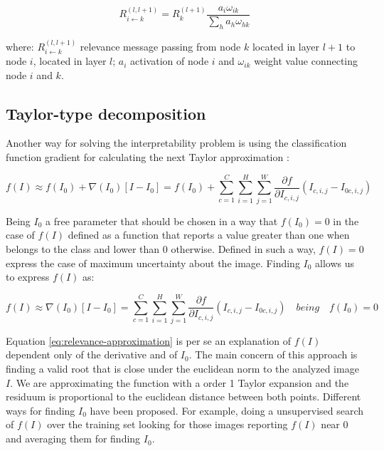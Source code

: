 \documentclass[preprint]{elsarticle}
\theoremstyle{definition} %
\theoremstyle{remark}
\begin{document}
\begin{equation}
R_{i \leftarrow k}^{(l,l+1)} = R_k^{(l+1)} \frac{a_i \omega_{ik}}{\sum_{h} a_h \omega_{hk}}
\label{eq:relevance-message-value}
\end{equation}

where: $R_{i \leftarrow k}^{(l,l+1)}$ relevance message passing from node $k$ located in layer $l+1$ to node $i$, located in layer $l$; $a_i$ activation of node $i$ and $\omega_{ik}$ weight value connecting node $i$ and $k$.


\subsection{Taylor-type decomposition} 

Another way for solving the interpretability problem is using the classification function gradient for calculating the next Taylor approximation \cite{bach2015pixel}:

\begin{equation}
f(I) \approx f(I_0) + \nabla(I_0) [ I - I_0] = f(I_0) + \sum_{c=1}^C \sum_{i=1}^{H} \sum_{j=1}^W \frac{\partial f}{\partial I_{c,i,j}}(I_{c,i,j} - I_{0 c, i, j}) 
\label{eq:taylor}
\end{equation}

Being $I_0$ a free parameter that should be chosen in a way that $f(I_0) = 0$ in the case of $f(I)$ defined as a function that reports a value greater than one when belongs to the class and lower than 0 otherwise. Defined in such a way, $f(I) = 0$ express the case of maximum uncertainty about the image. Finding $I_0$ allows us to express $f(I)$ as:

\begin{equation}
f(I) \approx \nabla(I_0) [ I - I_0] = \sum_{c=1}^C \sum_{i=1}^{H} \sum_{j=1}^W \frac{\partial f}{\partial I_{c,i,j}}(I_{c,i,j} - I_{0 c, i, j}) \quad  being \quad f(I_0) = 0
\label{eq:relevance-approximation}
\end{equation}

Equation \ref{eq:relevance-approximation} is per se an explanation of $f(I)$ dependent only of the derivative and of $I_0$. The main concern of this approach is finding a valid root that is close under the euclidean norm to the analyzed image $I$. We are approximating the function with a order 1 Taylor expansion and the residuum is proportional to the euclidean distance between both points. Different ways for finding $I_0$ have been proposed. For example, doing a unsupervised search of $f(I)$ over the training set looking for those images reporting $f(I)$ near 0 and averaging them for finding $I_0$.
\end{document}
